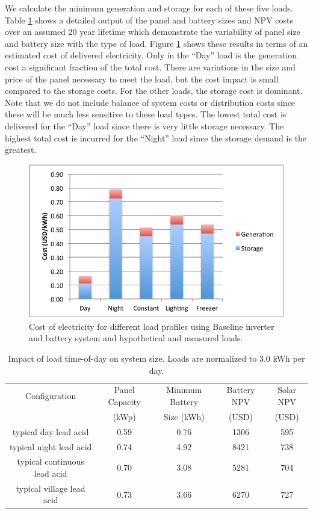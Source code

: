 \documentclass[conference]{IEEEtran}
\begin{document}
We calculate the minimum generation and storage for each
of these five loads.
Table \ref{tbl_baseline} shows a detailed output of the panel and
battery sizes and NPV costs over an assumed 20 year lifetime
which demonstrate the variability of panel size and battery
size with the type of load.
Figure \ref{fig_baseline}
shows these results in terms of an estimated cost of delivered
electricity.
Only in the ``Day'' load is the generation cost a significant
fraction of the total cost.
There are variations in the size and price of the panel
necessary to meet the load, but the cost impact is small
compared to the storage costs.
For the other loads, the storage cost is dominant.
Note that we do not include balance of system costs or
distribution costs since these will be much less sensitive
to these load types.
The lowest total cost is delivered for the ``Day'' load
since there is very little storage necessary.
The highest total cost is incurred for the ``Night'' load since
the storage demand is the greatest.


\begin{figure}[]
\begin{center}
\includegraphics[width=\columnwidth]{figures/baseline.pdf}
\end{center}
\caption{Cost of electricity for different load profiles using Baseline
inverter and battery system and hypothetical and measured loads.}
\label{fig_baseline}
\end{figure}

\begin{table}
\centering
\begin{tabular}{c c c c c}
Configuration & Panel Capacity & Minimum Battery & Battery NPV & Solar NPV \\
              & (kWp)          & Size (kWh)      & (USD)       & (USD)     \\
\hline
typical day lead acid          & 0.59 & 0.76 & 1306 & 595 \\
typical night lead acid        & 0.74 & 4.92 & 8421 & 738 \\
typical continuous lead acid   & 0.70 & 3.08 & 5281 & 704 \\
typical village lead acid      & 0.73 & 3.66 & 6270 & 727 \\
\end{tabular}
\caption{Impact of load time-of-day on system size.
Loads are normalized to 3.0 kWh per day.}
\label{tbl_baseline}
\end{table}
\end{document}

